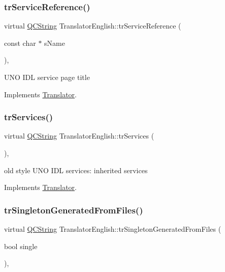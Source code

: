 \subsubsection{\texorpdfstring{trServiceReference()}{trServiceReference()}}
{\footnotesize\ttfamily virtual \mbox{\hyperlink{class_q_c_string}{Q\+C\+String}} Translator\+English\+::tr\+Service\+Reference (\begin{DoxyParamCaption}\item[{const char $\ast$}]{s\+Name }\end{DoxyParamCaption})\hspace{0.3cm}{\ttfamily [inline]}, {\ttfamily [virtual]}}

U\+NO I\+DL service page title 

Implements \mbox{\hyperlink{class_translator}{Translator}}.

\mbox{\label{class_translator_english_a0ca425c7d0b6dac236646feb6b8c1839}} 
\subsubsection{\texorpdfstring{trServices()}{trServices()}}
{\footnotesize\ttfamily virtual \mbox{\hyperlink{class_q_c_string}{Q\+C\+String}} Translator\+English\+::tr\+Services (\begin{DoxyParamCaption}{ }\end{DoxyParamCaption})\hspace{0.3cm}{\ttfamily [inline]}, {\ttfamily [virtual]}}

old style U\+NO I\+DL services\+: inherited services 

Implements \mbox{\hyperlink{class_translator}{Translator}}.

\mbox{\label{class_translator_english_a96741d8aecb5a3f7fb51a085b3937885}} 
\subsubsection{\texorpdfstring{trSingletonGeneratedFromFiles()}{trSingletonGeneratedFromFiles()}}
{\footnotesize\ttfamily virtual \mbox{\hyperlink{class_q_c_string}{Q\+C\+String}} Translator\+English\+::tr\+Singleton\+Generated\+From\+Files (\begin{DoxyParamCaption}\item[{bool}]{single }\end{DoxyParamCaption})\hspace{0.3cm}{\ttfamily [inline]}, {\ttfamily [virtual]}}


